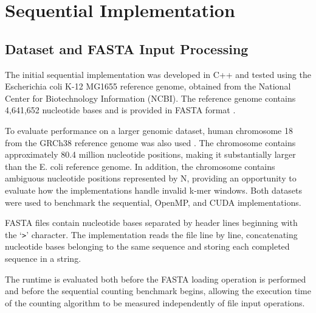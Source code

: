 \documentclass{article}
\begin{document}

\section{Sequential Implementation}

\vspace{\baselineskip}

\subsection{Dataset and FASTA Input Processing}

\vspace{\baselineskip}

The initial sequential implementation was developed in C++ and tested using the Escherichia coli 
K-12 MG1655 reference genome, obtained from the National Center for Biotechnology Information (NCBI).
The reference genome contains 4,641,652 nucleotide bases and is provided in FASTA format \cite{ncbi_ecoli}.

\vspace{\baselineskip}

To evaluate performance on a larger genomic dataset, human chromosome 18 from the GRCh38
reference genome was also used \cite{ucsc_chr18}. The chromosome contains approximately 80.4 million nucleotide
positions, making it substantially larger than the E. coli reference genome. In addition,
the chromosome contains ambiguous nucleotide positions represented by N, providing an
opportunity to evaluate how the implementations handle invalid k-mer windows. Both datasets
were used to benchmark the sequential, OpenMP, and CUDA implementations.

\vspace{\baselineskip}

FASTA files contain nucleotide bases separated by header lines beginning with the `\texttt{>}' character.
The implementation reads the file line by line, concatenating nucleotide bases belonging to the same sequence
and storing each completed sequence in a string.

\vspace{\baselineskip}

The runtime is evaluated both before the FASTA loading operation is performed and before the sequential counting benchmark begins, allowing the
execution time of the counting algorithm to be measured independently of file input operations. 
\end{document}
